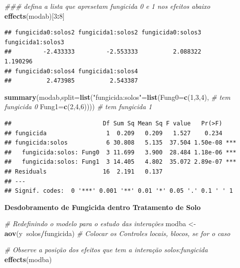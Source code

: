 \documentclass[
]{book}
\newenvironment{Shaded}{\begin{snugshade}}{\end{snugshade}}
\newcommand{\CommentTok}[1]{\textcolor[rgb]{0.56,0.35,0.01}{\textit{#1}}}
\newcommand{\DataTypeTok}[1]{\textcolor[rgb]{0.13,0.29,0.53}{#1}}
\newcommand{\DecValTok}[1]{\textcolor[rgb]{0.00,0.00,0.81}{#1}}
\newcommand{\KeywordTok}[1]{\textcolor[rgb]{0.13,0.29,0.53}{\textbf{#1}}}
\newcommand{\NormalTok}[1]{#1}
\newcommand{\OperatorTok}[1]{\textcolor[rgb]{0.81,0.36,0.00}{\textbf{#1}}}
\newcommand{\StringTok}[1]{\textcolor[rgb]{0.31,0.60,0.02}{#1}}
\begin{document}
\begin{Shaded}
\begin{Highlighting}[]
\CommentTok{### defina a lista que apresetam fungicida 0 e 1 nos efeitos abaixo}
\KeywordTok{effects}\NormalTok{(modab)[}\DecValTok{3}\OperatorTok{:}\DecValTok{8}\NormalTok{]}
\end{Highlighting}
\end{Shaded}

\begin{verbatim}
## fungicida0:solos2 fungicida1:solos2 fungicida0:solos3 fungicida1:solos3 
##         -2.433333         -2.553333          2.088322          1.190296 
## fungicida0:solos4 fungicida1:solos4 
##          2.473985          2.543387
\end{verbatim}

\begin{Shaded}
\begin{Highlighting}[]
\KeywordTok{summary}\NormalTok{(modab,}\DataTypeTok{split=}\KeywordTok{list}\NormalTok{(}\StringTok{"fungicida:solos"}\NormalTok{=}\KeywordTok{list}\NormalTok{(}\DataTypeTok{Fung0=}\KeywordTok{c}\NormalTok{(}\DecValTok{1}\NormalTok{,}\DecValTok{3}\NormalTok{,}\DecValTok{4}\NormalTok{), }\CommentTok{# tem fungicida 0}
                                                \DataTypeTok{Fung1=}\KeywordTok{c}\NormalTok{(}\DecValTok{2}\NormalTok{,}\DecValTok{4}\NormalTok{,}\DecValTok{6}\NormalTok{)))) }\CommentTok{# tem fungicida 1}
\end{Highlighting}
\end{Shaded}

\begin{verbatim}
##                          Df Sum Sq Mean Sq F value   Pr(>F)    
## fungicida                 1  0.209   0.209   1.527    0.234    
## fungicida:solos           6 30.808   5.135  37.504 1.50e-08 ***
##   fungicida:solos: Fung0  3 11.699   3.900  28.484 1.18e-06 ***
##   fungicida:solos: Fung1  3 14.405   4.802  35.072 2.89e-07 ***
## Residuals                16  2.191   0.137                     
## ---
## Signif. codes:  0 '***' 0.001 '**' 0.01 '*' 0.05 '.' 0.1 ' ' 1
\end{verbatim}

\textbf{Desdobramento de Fungicida dentro Tratamento de Solo}

\begin{Shaded}
\begin{Highlighting}[]
\CommentTok{# Redefinindo o modelo para o estudo das interações}
\NormalTok{modba <-}\StringTok{ }\KeywordTok{aov}\NormalTok{(y}\OperatorTok{~}\NormalTok{solos}\OperatorTok{/}\NormalTok{fungicida) }\CommentTok{# Colocar os Controles locais, blocos, se for o caso}

\CommentTok{# Observe a posição dos efeitos que tem a interação solos:fungicida}
\KeywordTok{effects}\NormalTok{(modba)}
\end{Highlighting}
\end{Shaded}
\end{document}
